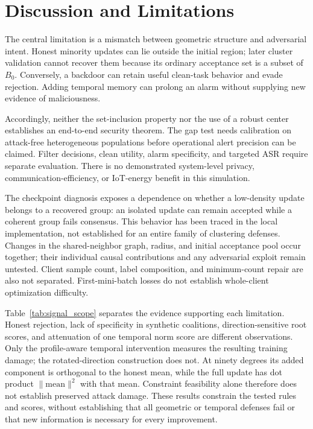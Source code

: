 \documentclass[journal]{IEEEtran}
\begin{document}
\section{Discussion and Limitations}
The central limitation is a mismatch between geometric structure and adversarial intent. Honest minority updates can lie outside the initial region; later cluster validation cannot recover them because its ordinary acceptance set is a subset of $B_0$. Conversely, a backdoor can retain useful clean-task behavior and evade rejection. Adding temporal memory can prolong an alarm without supplying new evidence of maliciousness.

Accordingly, neither the set-inclusion property nor the use of a robust center establishes an end-to-end security theorem. The gap test needs calibration on attack-free heterogeneous populations before operational alert precision can be claimed. Filter decisions, clean utility, alarm specificity, and targeted ASR require separate evaluation. There is no demonstrated system-level privacy, communication-efficiency, or IoT-energy benefit in this simulation.

The checkpoint diagnosis exposes a dependence on whether a low-density update belongs to a recovered group: an isolated update can remain accepted while a coherent group fails consensus. This behavior has been traced in the local implementation, not established for an entire family of clustering defenses. Changes in the shared-neighbor graph, radius, and initial acceptance pool occur together; their individual causal contributions and any adversarial exploit remain untested. Client sample count, label composition, and minimum-count repair are also not separated. First-mini-batch losses do not establish whole-client optimization difficulty.

Table~\ref{tab:signal_scope} separates the evidence supporting each limitation. Honest rejection, lack of specificity in synthetic coalitions, direction-sensitive root scores, and attenuation of one temporal norm score are different observations. Only the profile-aware temporal intervention measures the resulting training damage; the rotated-direction construction does not. At ninety degrees its added component is orthogonal to the honest mean, while the full update has dot product $\|\mathrm{mean}\|^2$ with that mean. Constraint feasibility alone therefore does not establish preserved attack damage. These results constrain the tested rules and scores, without establishing that all geometric or temporal defenses fail or that new information is necessary for every improvement.
\end{document}
